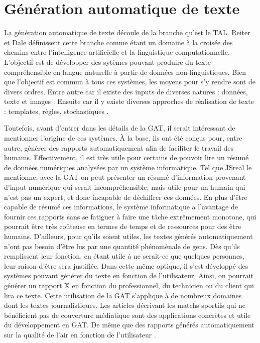 
\chapter{Génération automatique de texte}


La génération automatique de texte découle de la branche qu'est le \ac{TAL}. Reiter et Dale \citep{ReiterBuildingNaturalLanguage2000} définissent cette branche comme étant un domaine à la croisée des chemins entre l'intelligence artificielle et la linguistique computationnelle. L'objectif est de développer des sytèmes pouvant produire du texte compréhensible en langue naturelle à partir de données non-linguistiques. Bien que l'objectif est commun à tous ces systèmes, les moyens pour s'y rendre sont de divers ordres. Entre autre car il existe des inputs de diverses natures : données, texte et images \citep{thomason:coling14}. Ensuite car il y existe diverses approches de réalisation de texte : templates, règles, stochastiques \citep{gatt18}.

Toutefois, avant d'entrer dans les détails de la \ac{GAT}, il serait intéressant de mentionner l'origine de ces systèmes. À la base, ils ont été conçus pour, entre autre, générer des rapports automatiquement afin de faciliter le travail des humains. Effectivement, il est très utile pour certains de pouvoir lire un résumé de données numériques analysées par un système informatique. Tel que JSreal le mentionne, avec la GAT on peut présenter un résumé d'information provenant d'input numérique qui serait incompréhensible, mais utile pour un humain qui n'est pas un expert, et donc incapable de déchiffrer ces données. En plus d'être capable de résumé ces informations, le système informatique a l'avantage de fournir ces rapports sans se fatiguer à faire une tâche extrêmement monotone, qui pourrait être très coûteuse en termes de temps et de ressources pour des être humains.  D'ailleurs, pour qu'ils soient utiles, les textes générés automatiquement n'ont pas besoin d'être lus par une quantité phénomènale de gens. Dès qu'ils remplissent leur fonction, en étant utile à ne serait-ce que quelques personnes, leur raison d'être sera justifiée.  Dans cette même optique, il s'est développé des systèmes pouvant générer du texte en fonction de l'utilisateur. Ainsi, on pourrait générer un rapport X en fonction du professionnel, du technicien ou du client \citep{1948c0b7a8ca42679cad977bb2cdddc2} qui lira ce texte. Cette utilisation de la \ac{GAT} s'applique à de nombreux domaines dont les textes journalistiques. Les articles décrivant les matchs sportifs qui ne bénéficient pas de couverture médiatique \citep{W17-3513} sont des applications concrètes et utile du développement en \ac{GAT}. De même que des rapports générés automatiquement sur la qualité de l'air en fonction de l'utilisateur \citep{WannerMARQUISGENERATIONUSERTAILORED2010}.

